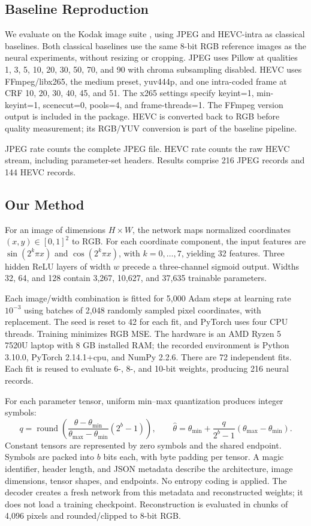 \documentclass[11pt]{article}
\begin{document}
\subsection{Baseline Reproduction}
We evaluate on the Kodak image suite \citep{kodak},
using JPEG \citep{jpeg} and HEVC-intra \citep{hevc}
as classical baselines.
Both classical baselines use the same 8-bit RGB reference images as the neural experiments, without resizing or cropping. JPEG uses Pillow at qualities 1, 3, 5, 10, 20, 30, 50, 70, and 90 with chroma subsampling disabled. HEVC uses FFmpeg/libx265, the medium preset, yuv444p, and one intra-coded frame at CRF 10, 20, 30, 40, 45, and 51. The x265 settings specify keyint=1, min-keyint=1, scenecut=0, pools=4, and frame-threads=1. The FFmpeg version output is included in the package. HEVC is converted back to RGB before quality measurement; its RGB/YUV conversion is part of the baseline pipeline.

JPEG rate counts the complete JPEG file. HEVC rate counts the raw HEVC stream, including parameter-set headers. Results comprise 216 JPEG records and 144 HEVC records.
\subsection{Our Method}
For an image of dimensions $H\times W$, the network maps normalized coordinates $(x,y)\in[0,1]^2$ to RGB. For each coordinate component, the input features are $\sin(2^k\pi x)$ and $\cos(2^k\pi x)$, with $k=0,\ldots,7$, yielding 32 features. Three hidden ReLU layers of width $w$ precede a three-channel sigmoid output. Widths 32, 64, and 128 contain 3,267, 10,627, and 37,635 trainable parameters.

Each image/width combination is fitted for 5,000 Adam steps at learning rate $10^{-3}$ using batches of 2,048 randomly sampled pixel coordinates, with replacement. The seed is reset to 42 for each fit, and PyTorch uses four CPU threads. Training minimizes RGB MSE. The hardware is an AMD Ryzen 5 7520U laptop with 8 GB installed RAM; the recorded environment is Python 3.10.0, PyTorch 2.14.1+cpu, and NumPy 2.2.6. There are 72 independent fits. Each fit is reused to evaluate 6-, 8-, and 10-bit weights, producing 216 neural records.

For each parameter tensor, uniform min--max quantization produces integer symbols:
\begin{equation}
q=\operatorname{round}\left(\frac{\theta-\theta_{\min}}{\theta_{\max}-\theta_{\min}}(2^b-1)\right),\qquad
\hat\theta=\theta_{\min}+\frac{q}{2^b-1}(\theta_{\max}-\theta_{\min}).
\end{equation}
Constant tensors are represented by zero symbols and the shared endpoint. Symbols are packed into $b$ bits each, with byte padding per tensor. A magic identifier, header length, and JSON metadata describe the architecture, image dimensions, tensor shapes, and endpoints. No entropy coding is applied. The decoder creates a fresh network from this metadata and reconstructed weights; it does not load a training checkpoint. Reconstruction is evaluated in chunks of 4,096 pixels and rounded/clipped to 8-bit RGB.
\end{document}
